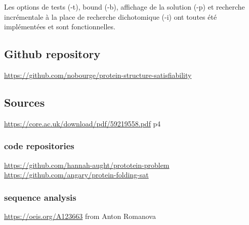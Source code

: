 \documentclass[utf8]{article}
\begin{document}
Les options de tests (-t), bound (-b), affichage de la solution (-p) et recherche incrémentale à la place de recherche dichotomique (-i) ont toutes été implémentées et sont fonctionnelles.

\subsection{Github repository}
\hyperlink{https://github.com/nobourge/protein-structure-satisfiability}{https://github.com/nobourge/protein-structure-satisfiability}

\subsection{Sources}
\hyperlink{https://core.ac.uk/download/pdf/59219558.pdf}{https://core.ac.uk/download/pdf/59219558.pdf} p4

\subsubsection{code repositories}
\hyperlink{https://github.com/hannah-aught/prototein-problem}{https://github.com/hannah-aught/prototein-problem}
\\
\hyperlink{https://github.com/angary/protein-folding-sat}{https://github.com/angary/protein-folding-sat}

\subsubsection{sequence analysis}
\hyperlink{https://oeis.org/A123663}{https://oeis.org/A123663} from Anton Romanova
\end{document}
